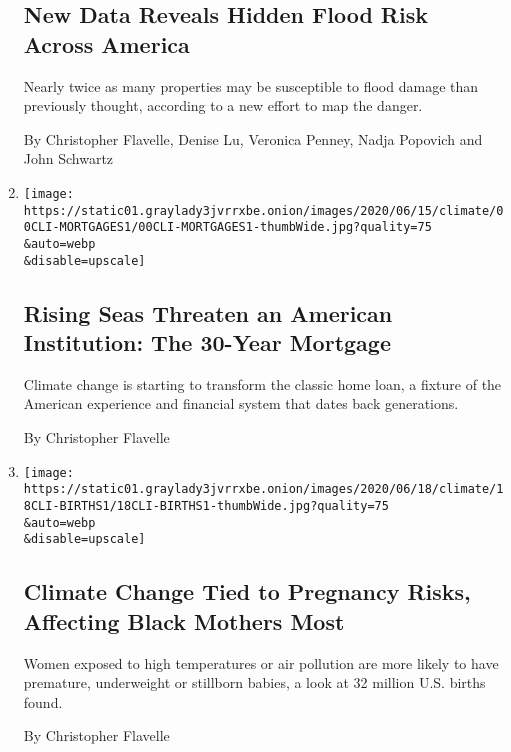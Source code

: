 \begin{enumerate}
  \hypertarget{new-data-reveals-hidden-flood-risk-across-america}{%
  \subsection{New Data Reveals Hidden Flood Risk Across
  America}\label{new-data-reveals-hidden-flood-risk-across-america}}

  Nearly twice as many properties may be susceptible to flood damage
  than previously thought, according to a new effort to map the danger.

  By Christopher Flavelle, Denise Lu, Veronica Penney, Nadja Popovich
  and John Schwartz
\item
  \href{/2020/06/19/climate/climate-seas-30-year-mortgage.html}{}

  \texttt{[image: https://static01.graylady3jvrrxbe.onion/images/2020/06/15/climate/00CLI-MORTGAGES1/00CLI-MORTGAGES1-thumbWide.jpg?quality=75\\\&auto=webp\\\&disable=upscale]}

  \hypertarget{rising-seas-threaten-an-american-institution-the-30-year-mortgage}{%
  \subsection{Rising Seas Threaten an American Institution: The 30-Year
  Mortgage}\label{rising-seas-threaten-an-american-institution-the-30-year-mortgage}}

  Climate change is starting to transform the classic home loan, a
  fixture of the American experience and financial system that dates
  back generations.

  By Christopher Flavelle
\item
  \href{/2020/06/18/climate/climate-change-pregnancy-study.html}{}

  \texttt{[image: https://static01.graylady3jvrrxbe.onion/images/2020/06/18/climate/18CLI-BIRTHS1/18CLI-BIRTHS1-thumbWide.jpg?quality=75\\\&auto=webp\\\&disable=upscale]}

  \hypertarget{climate-change-tied-to-pregnancy-risks-affecting-black-mothers-most}{%
  \subsection{Climate Change Tied to Pregnancy Risks, Affecting Black
  Mothers
  Most}\label{climate-change-tied-to-pregnancy-risks-affecting-black-mothers-most}}

  Women exposed to high temperatures or air pollution are more likely to
  have premature, underweight or stillborn babies, a look at 32 million
  U.S. births found.

  By Christopher Flavelle
\end{enumerate}

